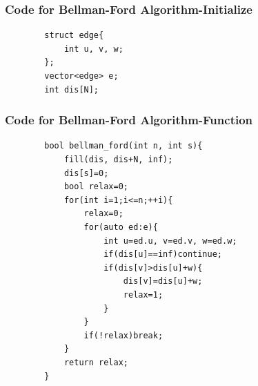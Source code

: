 \documentclass[xcolor=dvipsnames]{beamer}
\begin{document}
    \begin{frame}[fragile]
        \frametitle{Code for Bellman-Ford Algorithm-Initialize}
        \begin{verbatim}
        struct edge{
            int u, v, w;
        };
        vector<edge> e;
        int dis[N];
        \end{verbatim}
        
    \end{frame}

    \begin{frame}[fragile]
        \frametitle{Code for Bellman-Ford Algorithm-Function}
        \begin{verbatim}
        bool bellman_ford(int n, int s){
            fill(dis, dis+N, inf);
            dis[s]=0;
            bool relax=0;
            for(int i=1;i<=n;++i){
                relax=0;
                for(auto ed:e){
                    int u=ed.u, v=ed.v, w=ed.w;
                    if(dis[u]==inf)continue;
                    if(dis[v]>dis[u]+w){
                        dis[v]=dis[u]+w;
                        relax=1;
                    }
                }
                if(!relax)break;
            }
            return relax;
        }
        \end{verbatim}
        
    \end{frame}
\end{document}
